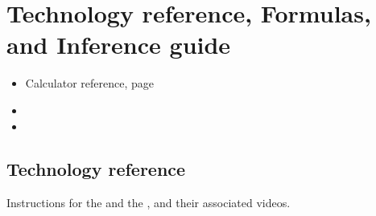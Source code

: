 \chapter{Technology reference, Formulas, and Inference guide}

\begin{itemize}
\item Calculator reference, page~\pageref{calculatorIndex}
\item {}
\item {}
\end{itemize}

\newpage

\vspace{-55mm}

\section{Technology reference}
\label{calculatorIndex}
Instructions for the  and the , and their associated videos.


